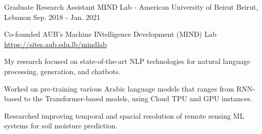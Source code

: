 \begin{cventries}
  \cventry
    {Graduate Research Assistant} %
    {MIND Lab - American University of Beirut} %
    {Beirut, Lebanon} %
    {Sep. 2018 - Jan. 2021} %
    {
      \begin{cvitems} %
        \item {Co-founded AUB’s Machine INtelligence Development (MIND) Lab  \hyperlink{sites.aub.edu.lb/mindlab}{\url{https://sites.aub.edu.lb/mindlab}}}
        \item {My research focused on state-of-the-art NLP technologies for natural language processing, generation, and chatbots.}
        \item {Worked on pre-training various Arabic language models that ranges from RNN-based to the Transformer-based models, using Cloud TPU and GPU instances.}
        \item {Researched improving temporal and spacial resolution of remote sensing ML systems for soil moisture prediction.}
      \end{cvitems}
    }


\end{cventries}
